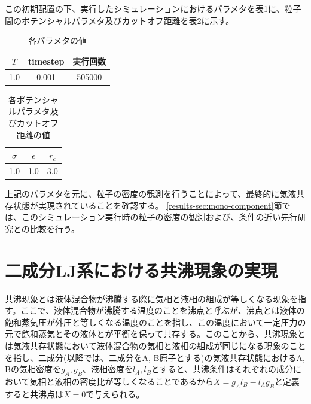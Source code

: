 \documentclass[titlepage]{jsreport}
\begin{document}
この初期配置の下、実行したシミュレーションにおけるパラメタを表\ref{table:mono-component-parameter}に、粒子間のポテンシャルパラメタ及びカットオフ距離を表\ref{table:mono-component-potential-parameter}に示す。

\begin{table}[htbp]
    \begin{center}
        \caption{各パラメタの値}
        \label{table:mono-component-parameter}
            \begin{tabular}{c c c}
                $T$ & timestep & 実行回数 \\
                \hline
                1.0 & 0.001 & 505000 \\
            \end{tabular}
    \end{center}
\end{table}

\begin{table}[htbp]
    \begin{center}
        \caption{各ポテンシャルパラメタ及びカットオフ距離の値}
        \label{table:mono-component-potential-parameter}
            \begin{tabular}{c c c}
                $\sigma$ & $\epsilon$ & $r_c$ \\
                \hline
                1.0 & 1.0 & 3.0\\
            \end{tabular}
    \end{center}
\end{table}

上記のパラメタを元に、粒子の密度の観測を行うことによって、最終的に気液共存状態が実現されていることを確認する。
\ref{results-sec:mono-component}節では、このシミュレーション実行時の粒子の密度の観測および、条件の近い先行研究との比較を行う。


\section{二成分LJ系における共沸現象の実現} \label{method-sec:bi-component-azeotrope}
共沸現象とは液体混合物が沸騰する際に気相と液相の組成が等しくなる現象を指す。ここで、液体混合物が沸騰する温度のことを沸点と呼ぶが、沸点とは液体の飽和蒸気圧が外圧と等しくなる温度のことを指し\cite{boiling-point}、この温度において一定圧力の元で飽和蒸気とその液体とが平衡を保って共存する。このことから、共沸現象とは気液共存状態において液体混合物の気相と液相の組成が同じになる現象のことを指し、二成分(以降では、二成分をA, B原子とする)の気液共存状態におけるA, Bの気相密度を$g_A, g_B$、液相密度を$l_A, l_B$とすると、共沸条件はそれぞれの成分において気相と液相の密度比が等しくなることであるから$X=g_Al_B-l_Ag_B$と定義すると共沸点は$X=0$で与えられる。
\end{document}
